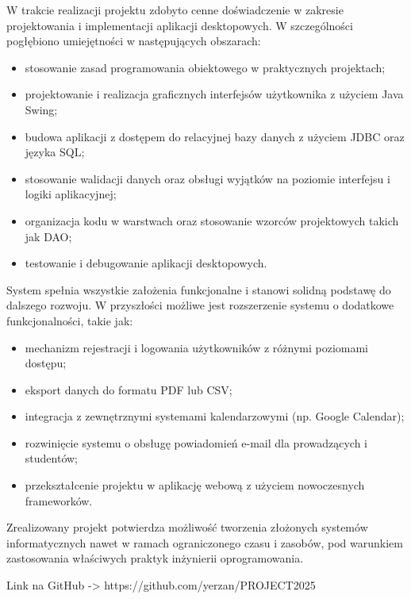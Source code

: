 W trakcie realizacji projektu zdobyto cenne doświadczenie w zakresie projektowania i implementacji aplikacji desktopowych. W szczególności pogłębiono umiejętności w następujących obszarach:

\begin{itemize}
    \item stosowanie zasad programowania obiektowego w praktycznych projektach;
    \item projektowanie i realizacja graficznych interfejsów użytkownika z użyciem Java Swing;
    \item budowa aplikacji z dostępem do relacyjnej bazy danych z użyciem JDBC oraz języka SQL;
    \item stosowanie walidacji danych oraz obsługi wyjątków na poziomie interfejsu i logiki aplikacyjnej;
    \item organizacja kodu w warstwach oraz stosowanie wzorców projektowych takich jak DAO;
    \item testowanie i debugowanie aplikacji desktopowych.
\end{itemize}

System spełnia wszystkie założenia funkcjonalne i stanowi solidną podstawę do dalszego rozwoju. W przyszłości możliwe jest rozszerzenie systemu o dodatkowe funkcjonalności, takie jak:

\begin{itemize}
    \item mechanizm rejestracji i logowania użytkowników z różnymi poziomami dostępu;
    \item eksport danych do formatu PDF lub CSV;
    \item integracja z zewnętrznymi systemami kalendarzowymi (np. Google Calendar);
    \item rozwinięcie systemu o obsługę powiadomień e-mail dla prowadzących i studentów;
    \item przekształcenie projektu w aplikację webową z użyciem nowoczesnych frameworków.
\end{itemize}

Zrealizowany projekt potwierdza możliwość tworzenia złożonych systemów informatycznych nawet w ramach ograniczonego czasu i zasobów, pod warunkiem zastosowania właściwych praktyk inżynierii oprogramowania.

Link na GitHub -> https://github.com/yerzan/PROJECT2025